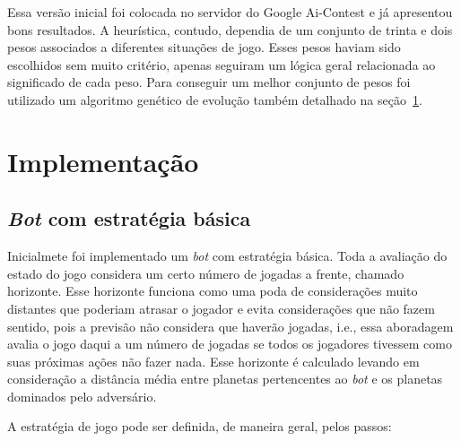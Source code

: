 \documentclass[a4paper,titlepage,11pt]{article}
\begin{document}
Essa versão inicial foi colocada no servidor do Google Ai-Contest e já apresentou bons resultados. A heurística, contudo, dependia de um conjunto de trinta e dois pesos associados a diferentes situações de jogo. Esses pesos haviam sido escolhidos sem muito critério, apenas seguiram um lógica geral relacionada ao significado de cada peso. Para conseguir um melhor conjunto de pesos foi utilizado um algoritmo genético de evolução também detalhado na seção~\ref{seq:Implementação}.

\section{Implementação}
\label{seq:Implementação}


\subsection{{\em Bot} com estratégia básica}
Inicialmete foi implementado um {\em bot} com estratégia básica. Toda a avaliação do estado do jogo considera um certo número de jogadas a frente, chamado horizonte. Esse horizonte funciona como uma poda de considerações muito distantes que poderiam atrasar o jogador e evita considerações que não fazem sentido, pois a previsão não considera que haverão jogadas, i.e., essa aboradagem avalia o jogo daqui a um número de jogadas se todos os jogadores tivessem como suas próximas ações não fazer nada. Esse horizonte é calculado levando em consideração a distância média entre planetas pertencentes ao {\em bot} e os planetas dominados pelo adversário.

A estratégia de jogo pode ser definida, de maneira geral, pelos passos:
\end{document}

